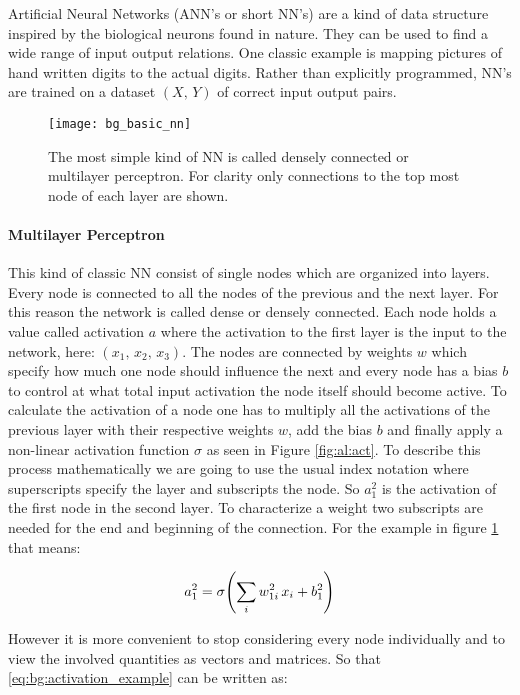 Artificial Neural Networks (ANN's or short NN's) are a kind of data structure inspired by the biological neurons found in nature. They can be used to find a wide range of input output relations. One classic example is mapping pictures of hand written digits to the actual digits. Rather than explicitly programmed, NN's are trained on a dataset $(X, \, Y)$ of correct input output pairs.
\\


\begin{figure}[H]
    \centering
    \texttt{[image: bg\_basic\_nn]}
    \caption{The most simple kind of NN is called densely connected or multilayer perceptron. For clarity only connections to the top most node of each layer are shown.}
    \label{fig:bg:basic_nn}
\end{figure}

\paragraph{Multilayer Perceptron}
This kind of classic NN consist of single nodes which are organized into layers. Every node is connected to all the nodes of the previous and the next layer. For this reason the network is called dense or densely connected. Each node holds a value called activation $a$ where the activation to the first layer is the input to the network, here:
$(x_1, \, x_2, \, x_3)$.
The nodes are connected by weights $w$ which specify how much one node should influence the next and every node has a bias $b$ to control at what total input activation the node itself should become active.
To calculate the activation of a node one has to multiply all the activations of the previous layer with their respective weights $w$, add the bias $b$ and finally apply a non-linear activation function $\sigma$ as seen in Figure \ref{fig:al:act}. To describe this process mathematically we are going to use the usual index notation where superscripts specify the layer and subscripts the node. So $a^2_1$ is the activation of the first node in the second layer. To characterize a weight two subscripts are needed for the end and beginning of the connection. For the example in figure \ref{fig:bg:basic_nn} that means:

\begin{equation} \label{eq:bg:activation_example}
    a^2_1 = \sigma \qty(\sum_i w^2_{1i} \, x_i + b^2_1)
\end{equation}

\noindent
However it is more convenient to stop considering every node individually and to view the involved quantities as vectors and matrices. So that \eqref{eq:bg:activation_example} can be written as:

